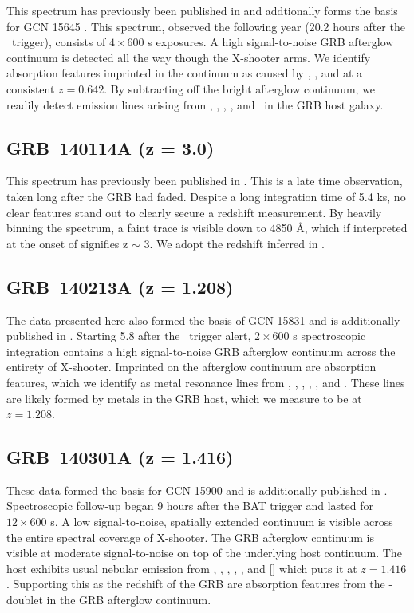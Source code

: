 \documentclass{aa}    %
\begin{document}
This spectrum has previously been published in \citet{Kruhler2015} and
addtionally forms the basis for GCN 15645 \citep{GCN15645}. This spectrum,
observed the following year (20.2 hours after the \swift~trigger), consists of
$4\times600$ s exposures. A high signal-to-noise GRB afterglow continuum is
detected all the way though the X-shooter arms. We identify absorption features
imprinted in the continuum as caused by \feii, \mgii, and \cahk at a consistent
$z = 0.642$. By subtracting off the bright afterglow continuum, we readily
detect emission lines arising from \oii, \hg, \hb, \oiii, and \ha~in the GRB
host galaxy.

\subsection{GRB~140114A (z = 3.0)}	\label{140114}

This spectrum has previously been published in \citet{Kruhler2015}. This is a
late time observation, taken long after the GRB had faded. Despite a long
integration time of 5.4 ks, no clear features stand out to clearly secure a
redshift measurement. By heavily binning the spectrum, a faint trace is visible
down to 4850 \AA, which if interpreted at the onset of \lya signifies z $\sim$
3. We adopt the redshift inferred in \citet{Kruhler2015}.

\subsection{GRB~140213A (z = 1.208)}\label{140213}

The data presented here also formed the basis of GCN 15831 \citep{GCN15831} and
is additionally published in \citet{Kruhler2015}. Starting 5.8 after the
\swift~trigger alert, $2\times600$ s spectroscopic integration contains a high
signal-to-noise GRB afterglow continuum across the entirety of X-shooter.
Imprinted on the afterglow continuum are absorption features, which we identify
as metal resonance lines from \civ, \alii, \aliii, \feii, \mgii, and \mgi. These
lines are likely formed by metals in the GRB host, which we measure to be at $z
= 1.208$.

\subsection{GRB~140301A (z = 1.416)}\label{140301}

These data formed the basis for GCN 15900 \citep{GCN15900} and is additionally
published in \citet{Kruhler2015}. Spectroscopic follow-up began 9 hours after
the BAT trigger and lasted for $12\times600$ s. A low signal-to-noise, spatially
extended continuum is visible across the entire spectral coverage of X-shooter.
The GRB afterglow continuum is visible at moderate signal-to-noise on top of the
underlying host continuum. The host exhibits usual nebular emission from \oii,
\hb, \oiii, \ha, \nii, and [\sii] which puts it at $z = 1.416$. Supporting this as
the redshift of the GRB are absorption features from the \mgii-doublet in the
GRB afterglow continuum.
\end{document}
